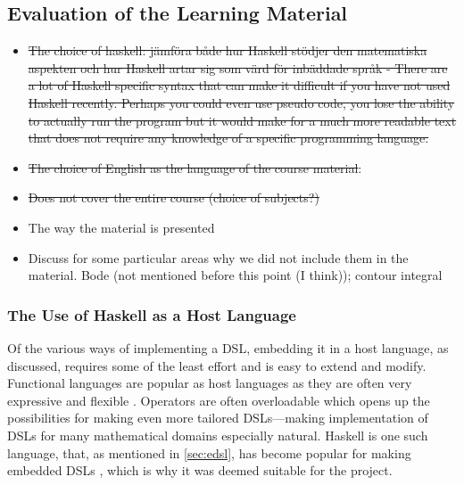 \subsection{Evaluation of the Learning Material}
\begin{itemize}

    \item \sout{The choice of haskell: jämföra både hur Haskell stödjer den matematiska aspekten och hur Haskell artar sig som värd för inbäddade språk - There are a lot of Haskell specific syntax that can make it difficult if you have not used Haskell recently. Perhaps you could even use pseudo code, you lose the ability to actually run the program but it would make for a much more readable text that does not require any knowledge of a specific programming language. }



\item \sout{The choice of English as the language of the course material}: 


\item \sout{Does not cover the entire course (choice of subjects?)}

\item The way the material is presented

\item Discuss for some particular areas why we did not include them in the material. Bode (not mentioned before this point (I think)); contour integral
\end{itemize}

\subsubsection{The Use of Haskell as a Host Language}

Of the various ways of implementing a DSL, embedding it in a host language, as discussed, requires some of the least effort and is easy to extend and modify. Functional languages are popular as host languages as they are often very expressive and flexible \cite{techniquesforedsls}. Operators are often overloadable which opens up the possibilities for making even more tailored DSLs---making implementation of DSLs for many mathematical domains especially natural. Haskell is one such language, that, as mentioned in \ref{sec:edsl}, has become popular for making embedded DSLs \cite{techniquesforedsls}, which is why it was deemed suitable for the project. 

